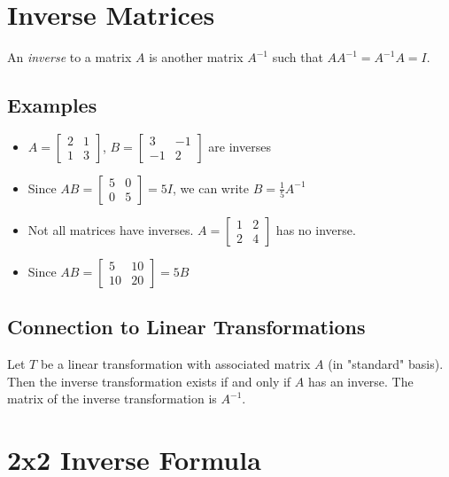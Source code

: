 \documentclass[12pt,a4paper]{article}
\begin{document}
\section{Inverse Matrices}

An \textit{inverse} to a matrix $A$ is another matrix $A^{-1}$ such that $AA^{-1} = A^{-1}A = I$.

\subsection{Examples}

\begin{itemize}
    \item $A = \begin{bmatrix} 2 & 1 \\ 1 & 3 \end{bmatrix}$, $B = \begin{bmatrix} 3 & -1 \\ -1 & 2 \end{bmatrix}$ are inverses
    \item Since $AB = \begin{bmatrix} 5 & 0 \\ 0 & 5 \end{bmatrix} = 5I$, we can write $B = \frac{1}{5}A^{-1}$
    \item Not all matrices have inverses. $A = \begin{bmatrix} 1 & 2 \\ 2 & 4 \end{bmatrix}$ has no inverse.
    \item Since $AB = \begin{bmatrix} 5 & 10 \\ 10 & 20 \end{bmatrix} = 5B$
\end{itemize}

\subsection{Connection to Linear Transformations}

Let $T$ be a linear transformation with associated matrix $A$ (in "standard" basis). Then the inverse transformation exists if and only if $A$ has an inverse. The matrix of the inverse transformation is $A^{-1}$.

\section{2x2 Inverse Formula}
\end{document}
